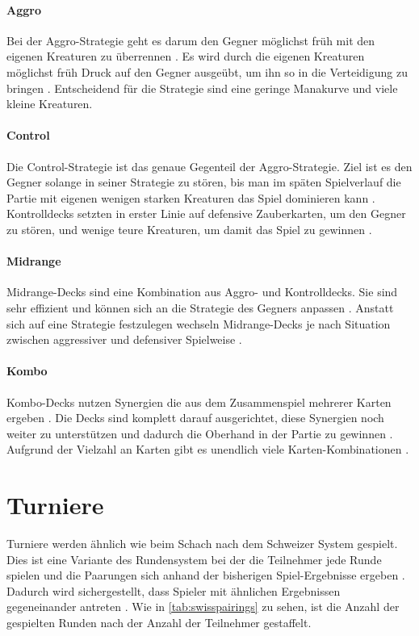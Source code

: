 \paragraph{Aggro}
Bei der Aggro-Strategie geht es darum den Gegner möglichst früh mit den eigenen Kreaturen zu überrennen \cite{wotc:gameplay}. Es wird durch die eigenen Kreaturen möglichst früh Druck auf den Gegner ausgeübt, um ihn so in die Verteidigung zu bringen \cite{wotc:gameplay}. Entscheidend für die Strategie sind eine geringe Manakurve und viele kleine Kreaturen.

\paragraph{Control}
Die Control-Strategie ist das genaue Gegenteil der Aggro-Strategie. Ziel ist es den Gegner solange in seiner Strategie zu stören, bis man im späten Spielverlauf die Partie mit eigenen wenigen starken Kreaturen das Spiel dominieren kann \cite{wotc:gameplay}. Kontrolldecks setzten in erster Linie auf defensive Zauberkarten, um den Gegner zu stören, und wenige teure Kreaturen, um damit das Spiel zu gewinnen \cite{wotc:gameplay}. 

\paragraph{Midrange}
Midrange-Decks sind eine Kombination aus Aggro- und Kontrolldecks. Sie sind sehr effizient und können sich an die Strategie des Gegners anpassen \cite{wotc:gameplay}. Anstatt sich auf eine Strategie festzulegen wechseln Midrange-Decks je nach Situation zwischen aggressiver und defensiver Spielweise \cite{wotc:gameplay}.

\paragraph{Kombo}
Kombo-Decks nutzen Synergien die aus dem Zusammenspiel mehrerer Karten ergeben \cite{wotc:gameplay}. Die Decks sind komplett darauf ausgerichtet, diese Synergien noch weiter zu unterstützen und dadurch die Oberhand in der Partie zu gewinnen \cite{wotc:gameplay}. Aufgrund der Vielzahl an Karten gibt es unendlich viele Karten-Kombinationen \cite{wotc:gameplay}.


\section{Turniere}
Turniere werden ähnlich wie beim Schach nach dem Schweizer System gespielt. Dies ist eine Variante des Rundensystem bei der die Teilnehmer jede Runde spielen und die Paarungen sich anhand der bisherigen Spiel-Ergebnisse ergeben \cite{starcitygames:swiss}. Dadurch wird sichergestellt, dass Spieler mit ähnlichen Ergebnissen gegeneinander antreten \cite{starcitygames:swiss}. Wie in \autoref{tab:swisspairings} zu sehen, ist die Anzahl der gespielten Runden nach der Anzahl der Teilnehmer gestaffelt. 

